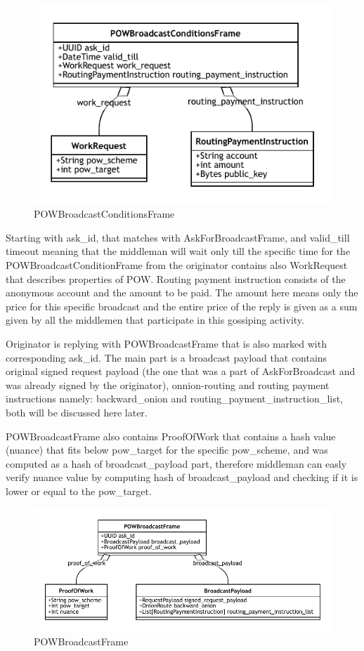 \documentclass{article}
\begin{document}
\begin{figure}
	\centering
	\includegraphics[scale=1.0]{POWBroadcastCondition.pdf}
	\caption{POWBroadcastConditionsFrame}
	\label{fig:fr:powbroadcastcondition}
\end{figure}

Starting with ask\_id, that matches with AskForBroadcastFrame, and valid\_till timeout meaning that the middleman will wait only till the specific time for the POWBroadcastConditionFrame from the originator contains also WorkRequest that describes properties of POW. Routing payment instruction consists of the anonymous account and the amount to be paid. The amount here means only the price for this specific broadcast and the entire price of the reply is given as a sum given by all the middlemen that participate in this gossiping activity.

Originator is replying with POWBroadcastFrame that is also marked with corresponding ask\_id. The main part is a broadcast payload that contains original signed request payload (the one that was a part of AskForBroadcast and was already signed by the originator), onnion-routing and routing payment instructions namely: backward\_onion and routing\_payment\_instruction\_list, both will be discussed here later.

POWBroadcastFrame also contains ProofOfWork that contains a hash value (nuance) that fits below pow\_target for the specific pow\_scheme, and was computed as a hash of broadcast\_payload part, therefore middleman can easly verify nuance value by computing hash of broadcast\_payload and checking if it is lower or equal to the pow\_target.

\begin{figure}
	\centering
	\includegraphics[scale=1.0]{POWBroadcastFrame.pdf}
	\caption{POWBroadcastFrame}
	\label{fig:fr:powbroadcastframe}
\end{figure}
\end{document}
